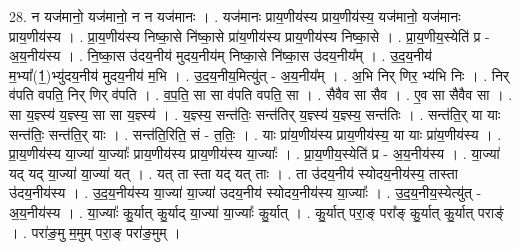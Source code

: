 \documentclass[17pt]{extarticle}
\begin{document}
28. न यज॑मानो॒ यज॑मानो॒ न न यज॑मानः । . यज॑मानः प्राय॒णीय॑स्य प्राय॒णीय॑स्य॒ यज॑मानो॒ यज॑मानः प्राय॒णीय॑स्य । . प्रा॒य॒णीय॑स्य निष्का॒से नि॑ष्का॒से प्रा॑य॒णीय॑स्य प्राय॒णीय॑स्य निष्का॒से । . प्रा॒य॒णीय॒स्येति॑ प्र - अ॒य॒नीय॑स्य । . नि॒ष्का॒स उ॑दय॒नीय॑ मुदय॒नीय॑म् निष्का॒से नि॑ष्का॒स उ॑दय॒नीय᳚म् । . उ॒द॒य॒नीय॑ म॒भ्या᳚(1॒)भ्यु॑दय॒नीय॑ मुदय॒नीय॑ म॒भि । . उ॒द॒य॒नीय॒मित्यु॑त् - अ॒य॒नीय᳚म् । . अ॒भि निर् णिर॒ भ्य॑भि निः । . निर् व॑पति वपति॒ निर् णिर् व॑पति । . व॒प॒ति॒ सा सा व॑पति वपति॒ सा । . सैवैव सा सैव । . ए॒व सा सैवैव सा । . सा य॒ज्ञ्स्य॑ य॒ज्ञ्स्य॒ सा सा य॒ज्ञ्स्य॑ । . य॒ज्ञ्स्य॒ सन्त॑तिः॒ सन्त॑तिर् य॒ज्ञ्स्य॑ य॒ज्ञ्स्य॒ सन्त॑तिः । . सन्त॑ति॒र् या याः सन्त॑तिः॒ सन्त॑ति॒र् याः । . सन्त॑ति॒रिति॒ सं - त॒तिः॒ । . याः प्रा॑य॒णीय॑स्य प्राय॒णीय॑स्य॒ या याः प्रा॑य॒णीय॑स्य । . प्रा॒य॒णीय॑स्य या॒ज्या॑ या॒ज्याः᳚ प्राय॒णीय॑स्य प्राय॒णीय॑स्य या॒ज्याः᳚ । . प्रा॒य॒णीय॒स्येति॑ प्र - अ॒य॒नीय॑स्य । . या॒ज्या॑ यद् यद् या॒ज्या॑ या॒ज्या॑ यत् । . यत् ता स्ता यद् यत् ताः । . ता उ॑दय॒नीय॑ स्योदय॒नीय॑स्य॒ तास्ता उ॑दय॒नीय॑स्य । . उ॒द॒य॒नीय॑स्य या॒ज्या॑ या॒ज्या॑ उदय॒नीय॑ स्योदय॒नीय॑स्य या॒ज्याः᳚ । . उ॒द॒य॒नीय॒स्येत्यु॑त् - अ॒य॒नीय॑स्य । . या॒ज्याः᳚ कु॒र्यात् कु॒र्याद् या॒ज्या॑ या॒ज्याः᳚ कु॒र्यात् । . कु॒र्यात् परा॒ङ् परा᳚ङ् कु॒र्यात् कु॒र्यात् पराङ्॑ । . परा॑ङ॒मु म॒मुम् परा॒ङ् परा॑ङ॒मुम् । \newline
\end{document}
